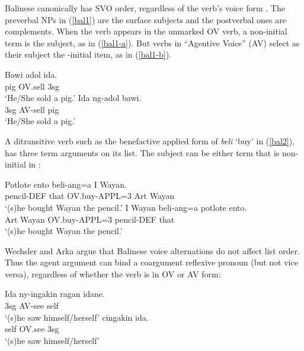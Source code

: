 \documentclass[output=paper
                ,modfonts
                ,nonflat
	        ,collection
	        ,collectionchapter
	        ,collectiontoclongg
 	        ,biblatex
                ,babelshorthands
                ,newtxmath
                ,draftmode
                ,colorlinks, citecolor=brown
]{./langsci/langscibook}
\begin{document}
 Balinese canonically has SVO order, regardless of the verb's voice form \citep{Artawa1994, Wechsler+Arka:1998}.  The preverbal NPs in  (\ref{bal1}) are the surface subjects and the postverbal ones are complements.  When the verb appears in the unmarked OV verb, a non-initial term is the subject, as in (\ref{bal1-a}).    But verbs in ``Agentive Voice'' (AV) select as their subject the \argst{}-initial item, as in (\ref{bal1-b}).  

\begin{exe}
	\ex\label{bal1}
\begin{xlist}
\ex \label{bal1-a}	\gll Bawi adol ida.  \\
		pig OV.sell 3sg   \\
		\glt `He/She sold a pig.'
\ex	\label{bal1-b}\gll Ida ng-adol bawi.  \\
		3sg AV-sell pig   \\
		\glt `He/She sold a pig.'
\end{xlist}
\end{exe} 

\noindent
A ditransitive verb  such as the benefactive applied form of \textit{beli} `buy' in (\ref{bal2}), has three term arguments on its \argst list.  The subject can be either term that is non-initial in \argst{}:

\begin{exe}
	\ex\label{bal2}
\begin{xlist}
\ex 	\gll Potlote ento beli-ang=a I Wayan.  \\
		pencil-DEF that OV.buy-APPL=3 Art Wayan   \\
		\glt `(s)he bought Wayan the pencil.'
\ex 	\gll I Wayan beli-ang=a potlote ento.   \\
		Art Wayan OV.buy-APPL=3 pencil-DEF that   \\
		\glt `(s)he bought Wayan the pencil.'
\end{xlist}
\end{exe} 

\noindent
Wechsler and Arka argue that Balinese voice alternations  do not affect \argst list order. 
Thus the agent argument can bind a coargument reflexive pronoun (but not vice versa), regardless of whether the verb is in OV or AV form:

\begin{exe}
	\ex\label{bal3}
\begin{xlist}
\ex 	\gll Ida ny-ingakin ragan idane. \\
		3sg AV-see self\\
		\glt ‘(s)he saw himself/herself’
\ex 	{} cingakin ida. \\
		self OV.see 3sg \\
		\glt ‘(s)he saw himself/herself’
\end{xlist}
\end{exe} 
\end{document}
